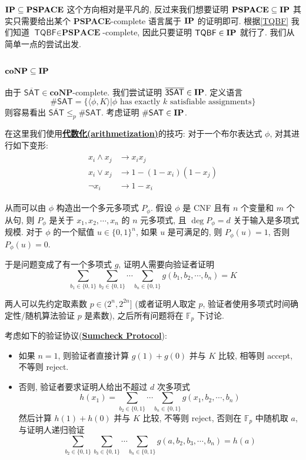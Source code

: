 \documentclass[8pt]{article}
\theoremstyle{compact}
\def\obj#1{\textbf{\uline{#1}}}
\def\le{\leqslant}
\def\coNP{\textbf{coNP}}
\def\PSPACE{\textbf{PSPACE}}
\begin{document}
$\IP \subseteq \PSPACE$ 这个方向相对是平凡的, 反过来我们想要证明 $\PSPACE \subseteq \IP$ 其实只需要给出某个 \PSPACE-complete 语言属于 $\textbf{IP}$ 的证明即可. 根据\cref{TQBF} 我们知道 $\textsf{TQBF} \in \PSPACE$-complete, 因此只要证明 $\textsf{TQBF} \in \textbf{IP}$ 就行了. 我们从简单一点的尝试出发. 

\subsubsection{$\coNP \subseteq \IP$}
由于 $\overline{\textsf{SAT}} \in \coNP$-complete. 我们尝试证明 $\overline{\textsf{3SAT}} \in \textbf{IP}$. 定义语言 $$\textsf{\#SAT} = \{\langle \phi, K \rangle | \phi \text{ has exactly } k \text{ satisfiable assignments}\}$$ 则容易看出 $\overline{\textsf{SAT}} \le_p \textsf{\#SAT}$. 考虑证明 $\textsf{\#SAT} \in \textbf{IP}$.

在这里我们使用\obj{代数化(arithmetization)}的技巧: 对于一个布尔表达式 $\phi$, 对其进行如下变形: \begin{align*}
	\begin{split}
		x_i \wedge x_j & \rightarrow x_ix_j \\
		x_i \vee x_j & \rightarrow 1 - (1 - x_i)(1 - x_j) \\
		\lnot x_i & \rightarrow 1 - x_i
	\end{split}
\end{align*}

从而可以由 $\phi$ 构造出一个多元多项式 $P_{\phi}$. 假设 $\phi$ 是 CNF 且有 $n$ 个变量和 $m$ 个从句, 则 $P_{\phi}$ 是关于 $x_1, x_2, \cdots, x_n$ 的 $n$ 元多项式, 且 $\deg P_{\phi} = d$ 关于输入是多项式规模. 对于 $\phi$ 的一个赋值 $u \in \{0, 1\}^n$, 如果 $u$ 是可满足的, 则 $P_{\phi}(u) = 1$, 否则 $P_{\phi}(u) = 0$.

于是问题变成了有一个多项式 $g$, 证明人需要向验证者证明 $$\sum_{b_1 \in \{0, 1\}}\sum_{b_2 \in \{0, 1\}}\cdots \sum_{b_n \in \{0, 1\}}g(b_1, b_2, \cdots, b_n) = K$$

两人可以先约定取素数 $p \in (2^n, 2^{2n}]$ (或者证明人取定 $p$, 验证者使用多项式时间确定性/随机算法验证 $p$ 是素数), 之后所有问题将在 $\mathbb F_p$ 下讨论.

考虑如下的验证协议(\obj{Sumcheck Protocol}): \begin{itemize}
	\item 如果 $n = 1$, 则验证者直接计算 $g(1) + g(0)$ 并与 $K$ 比较, 相等则 accept, 不等则 reject.
 \item 否则, 验证者要求证明人给出不超过 $d$ 次多项式 $$h(x_1) = \sum_{b_2 \in \{0, 1\}}\cdots \sum_{b_n \in \{0, 1\}}g(x_1, b_2, \cdots, b_n)$$ 然后计算 $h(1) + h(0)$ 并与 $K$ 比较, 不等则 reject, 否则在 $\mathbb F_p$ 中随机取 $a$, 与证明人递归验证 $$\sum_{b_2 \in \{0, 1\}}\sum_{b_3 \in \{0, 1\}}\cdots \sum_{b_n \in \{0, 1\}}g(a, b_2, b_3, \cdots, b_n) = h(a)$$
\end{itemize}
\end{document}
